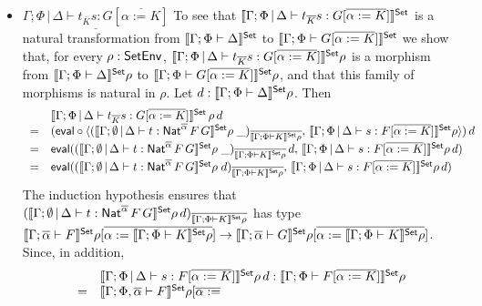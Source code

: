 \documentclass{lmcs}
\theoremstyle{plain}\newtheorem{satz}[thm]{Satz}
\begin{document}
{\begin{itemize}
\item 
$\underline{\Gamma;\Phi \,|\, \Delta \vdash t_{\overline K} s: G
  [\overline{\alpha := K}]}$\; 
  To see that $\llbracket{\Gamma;\Phi \,|\,
  \Delta \vdash t_{\overline K} s: G [\overline{\alpha := K}]}\rrbracket^{\mathsf{Set}}$ is a
  natural transformation from $\llbracket{\Gamma; \Phi \vdash \Delta}\rrbracket^{\mathsf{Set}}$ to
  $\llbracket{\Gamma;\Phi \vdash G [\overline{\alpha := K}]}\rrbracket^{\mathsf{Set}}$ we 
  show that, for every $\rho : \mathsf{SetEnv}$, $\llbracket{\Gamma;\Phi \,|\,
    \Delta \vdash t_{\overline K} s: G [\overline{\alpha := K}]}\rrbracket^{\mathsf{Set}}\rho$
  is a morphism from $\llbracket{\Gamma; \Phi \vdash \Delta}\rrbracket^{\mathsf{Set}}\rho$ to
  $\llbracket{\Gamma;\Phi \vdash G [\overline{\alpha := K}]}\rrbracket^{\mathsf{Set}}\rho$, and
  that this family of morphisms is natural in $\rho$. Let $d :
  \llbracket{\Gamma; \Phi \vdash \Delta}\rrbracket^{\mathsf{Set}}\rho$. Then
  \[\begin{array}{ll}
  & \llbracket{\Gamma;\Phi \,|\, \Delta \vdash t_{\overline K} s: G
  [\overline{\alpha := K}]}\rrbracket^{\mathsf{Set}}\,\rho\,d\\
= & (\mathsf{eval} \circ \langle (\llbracket{\Gamma; \emptyset \,|\, \Delta \vdash
  t : \mathsf{Nat}^{\overline{\alpha}} \,F \,G}\rrbracket^{\mathsf{Set}}\rho\;
\_)_{\overline{\llbracket{\Gamma;\Phi \vdash K}\rrbracket^{\mathsf{Set}}\rho}},\,
\llbracket{\Gamma;\Phi \,|\, \Delta \vdash s: F [\overline{\alpha :=
      K}]}\rrbracket^{\mathsf{Set}}\rho \rangle)\,d\\
= & \mathsf{eval} ((\llbracket{\Gamma; \emptyset \,|\, \Delta \vdash t :
  \mathsf{Nat}^{\overline{\alpha}} \,F \,G}\rrbracket^{\mathsf{Set}}\rho\;
\_)_{\overline{\llbracket{\Gamma;\Phi \vdash K}\rrbracket^{\mathsf{Set}}\rho}} \,d,\,
\llbracket{\Gamma;\Phi \,|\, \Delta \vdash s: F [\overline{\alpha :=
      K}]}\rrbracket^{\mathsf{Set}}\rho\, d)\\
= & \mathsf{eval} ((\llbracket{\Gamma; \emptyset \,|\, \Delta \vdash t :
  \mathsf{Nat}^{\overline{\alpha}} \,F \,G}\rrbracket^{\mathsf{Set}}\rho\;
d)_{\overline{\llbracket{\Gamma;\Phi \vdash K}\rrbracket^{\mathsf{Set}}\rho}},\,
\llbracket{\Gamma;\Phi \,|\, \Delta \vdash s: F [\overline{\alpha :=
      K}]}\rrbracket^{\mathsf{Set}}\rho\, d)\\
\end{array}\]
The induction hypothesis ensures that $(\llbracket{\Gamma; \emptyset \,|\,
  \Delta \vdash t : \mathsf{Nat}^{\overline{\alpha}} \,F \,G}\rrbracket^{\mathsf{Set}}\rho\,
d)_{\overline{\llbracket{\Gamma;\Phi \vdash K}\rrbracket^{\mathsf{Set}}\rho}}$ has type
$\llbracket{\Gamma; \overline{\alpha} \vdash F}\rrbracket^{\mathsf{Set}}\rho[\overline{\alpha :=
    \llbracket{\Gamma;\Phi \vdash K}\rrbracket^{\mathsf{Set}}\rho}] \to \llbracket{\Gamma;
  \overline{\alpha} \vdash G}\rrbracket^{\mathsf{Set}}\rho[\overline{\alpha := \llbracket{\Gamma;\Phi \vdash
      K}\rrbracket^{\mathsf{Set}}\rho}]$.  Since, in addition, 
\[\begin{array}{ll}
  &\llbracket{\Gamma;\Phi \,|\,
  \Delta \vdash s: F [\overline{\alpha := K}]}\rrbracket^{\mathsf{Set}}\rho\, d :
\llbracket{\Gamma; \Phi \vdash F[\overline{\alpha := K}]}\rrbracket^{\mathsf{Set}}\rho \\ 
  =&\llbracket{\Gamma; \Phi, \overline{\alpha} \vdash F}\rrbracket^{\mathsf{Set}}\rho[\overline{\alpha :=
}
\end{array}\]
\end{itemize}}
\end{document}

